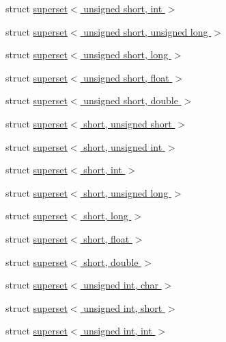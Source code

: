 \begin{DoxyCompactItemize}
\item 
struct \hyperlink{structcimg__library_1_1cimg_1_1superset_3_01unsigned_01short_00_01int_01_4}{superset$<$ unsigned short, int $>$}
\item 
struct \hyperlink{structcimg__library_1_1cimg_1_1superset_3_01unsigned_01short_00_01unsigned_01long_01_4}{superset$<$ unsigned short, unsigned long $>$}
\item 
struct \hyperlink{structcimg__library_1_1cimg_1_1superset_3_01unsigned_01short_00_01long_01_4}{superset$<$ unsigned short, long $>$}
\item 
struct \hyperlink{structcimg__library_1_1cimg_1_1superset_3_01unsigned_01short_00_01float_01_4}{superset$<$ unsigned short, float $>$}
\item 
struct \hyperlink{structcimg__library_1_1cimg_1_1superset_3_01unsigned_01short_00_01double_01_4}{superset$<$ unsigned short, double $>$}
\item 
struct \hyperlink{structcimg__library_1_1cimg_1_1superset_3_01short_00_01unsigned_01short_01_4}{superset$<$ short, unsigned short $>$}
\item 
struct \hyperlink{structcimg__library_1_1cimg_1_1superset_3_01short_00_01unsigned_01int_01_4}{superset$<$ short, unsigned int $>$}
\item 
struct \hyperlink{structcimg__library_1_1cimg_1_1superset_3_01short_00_01int_01_4}{superset$<$ short, int $>$}
\item 
struct \hyperlink{structcimg__library_1_1cimg_1_1superset_3_01short_00_01unsigned_01long_01_4}{superset$<$ short, unsigned long $>$}
\item 
struct \hyperlink{structcimg__library_1_1cimg_1_1superset_3_01short_00_01long_01_4}{superset$<$ short, long $>$}
\item 
struct \hyperlink{structcimg__library_1_1cimg_1_1superset_3_01short_00_01float_01_4}{superset$<$ short, float $>$}
\item 
struct \hyperlink{structcimg__library_1_1cimg_1_1superset_3_01short_00_01double_01_4}{superset$<$ short, double $>$}
\item 
struct \hyperlink{structcimg__library_1_1cimg_1_1superset_3_01unsigned_01int_00_01char_01_4}{superset$<$ unsigned int, char $>$}
\item 
struct \hyperlink{structcimg__library_1_1cimg_1_1superset_3_01unsigned_01int_00_01short_01_4}{superset$<$ unsigned int, short $>$}
\item 
struct \hyperlink{structcimg__library_1_1cimg_1_1superset_3_01unsigned_01int_00_01int_01_4}{superset$<$ unsigned int, int $>$}

\end{DoxyCompactItemize}
